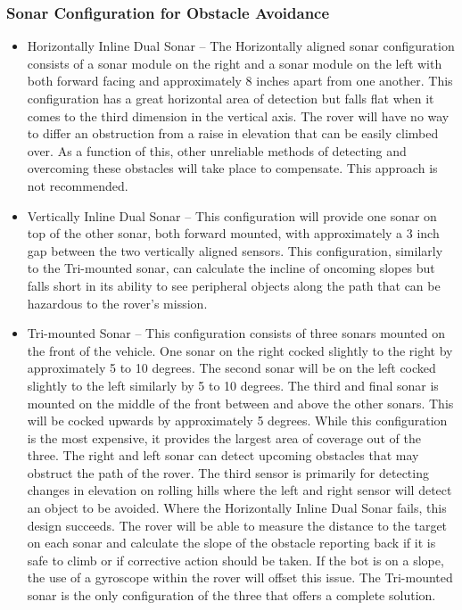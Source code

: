 \documentclass[onecolumn, draftclsnofoot, 10pt, compsoc]{IEEEtran}
\begin{document}
\subsubsection{Sonar Configuration for Obstacle Avoidance}
\begin{itemize}
	\item  Horizontally Inline Dual Sonar – The Horizontally aligned sonar configuration consists of a sonar module on the right and a sonar module on the left with both forward facing and approximately 8 inches apart from one another. This configuration has a great horizontal area of detection but falls flat when it comes to the third dimension in the vertical axis. The rover will have no way to differ an obstruction from a raise in elevation that can be easily climbed over. As a function of this, other unreliable methods of detecting and overcoming these obstacles will take place to compensate. This approach is not recommended.
	\item Vertically Inline Dual Sonar – This configuration will provide one sonar on top of the other sonar, both forward mounted, with approximately a 3 inch gap between the two vertically aligned sensors. This configuration, similarly to the Tri-mounted sonar, can calculate the incline of oncoming slopes but falls short in its ability to see peripheral objects along the path that can be hazardous to the rover’s mission.
	\item Tri-mounted Sonar – This configuration consists of three sonars mounted on the front of the vehicle. One sonar on the right cocked slightly to the right by approximately 5 to 10 degrees. The second sonar will be on the left cocked slightly to the left similarly by 5 to 10 degrees. The third and final sonar is mounted on the middle of the front between and above the other sonars. This will be cocked upwards by approximately 5 degrees. While this configuration is the most expensive, it provides the largest area of coverage out of the three. The right and left sonar can detect upcoming obstacles that may obstruct the path of the rover. The third sensor is primarily for detecting changes in elevation on rolling hills where the left and right sensor will detect an object to be avoided. Where the Horizontally Inline Dual Sonar fails, this design succeeds. The rover will be able to measure the distance to the target on each sonar and calculate the slope of the obstacle reporting back if it is safe to climb or if corrective action should be taken. If the bot is on a slope, the use of a gyroscope within the rover will offset this issue. The Tri-mounted sonar is the only configuration of the three that offers a complete solution.
\end{itemize}
\end{document}
